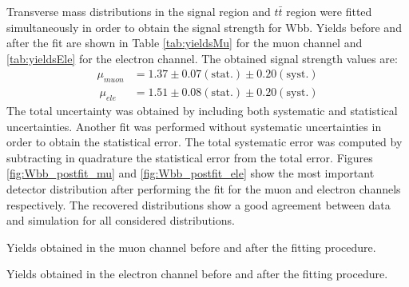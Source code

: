 Transverse mass distributions in the signal region and $t\bar{t}$ region were fitted simultaneously in order to obtain the signal strength for Wbb. Yields before and after the fit are shown in Table \ref{tab:yieldsMu} for the muon channel and \ref{tab:yieldsEle} for the electron channel. The obtained signal strength values are:
\begin{align*}
\mu_{muon} &= 1.37 \pm 0.07\mathrm{(stat.)} \pm 0.20 \mathrm{(syst.)}\\\
\mu_{ele} &= 1.51 \pm 0.08\mathrm{(stat.)} \pm 0.20\mathrm{(syst.)}
\end{align*}
The total uncertainty was obtained by including both systematic and statistical uncertainties. Another fit was performed without systematic uncertainties in order to obtain the statistical error. The total systematic error was computed by subtracting in quadrature the statistical error from the total error. 
Figures \ref{fig:Wbb_postfit_mu} and \ref{fig:Wbb_postfit_ele} show the most important detector distribution after performing the fit for the muon and electron channels respectively. The recovered distributions show a good agreement between data and simulation for all considered distributions.

\begin{table}[h!]
\caption{Yields obtained in the muon channel before and after the fitting procedure.}
\label{tab:yieldsMu}

\end{table}
\begin{table}[h!]
\caption{Yields obtained in the electron channel before and after the fitting procedure.}
\label{tab:yieldsEle}

\end{table}

